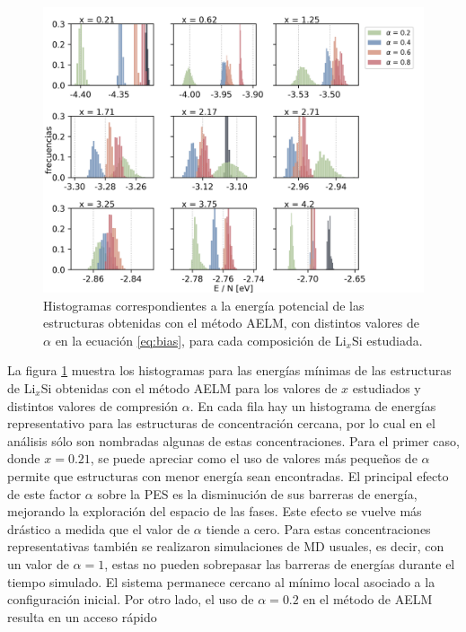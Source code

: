 \begin{figure}[th]
    \centering
    \includegraphics[width=\textwidth]{Silicio/caracterizacion/resultados/introduccion/energias.png}
    \caption{Histogramas correspondientes a la energía potencial de las 
    estructuras obtenidas con el método AELM, con distintos valores de $\alpha$
    en la ecuación \ref{eq:bias}, para cada composición de Li$_x$Si estudiada.}
    \label{fig:energias}
\end{figure}
La figura \ref{fig:energias} muestra los histogramas para las energías mínimas
de las estructuras de Li$_x$Si obtenidas con el método AELM para los valores de
$x$ estudiados y distintos valores de compresión $\alpha$. En cada fila hay un 
histograma de energías representativo para las estructuras de concentración 
cercana, por lo cual en el análisis sólo son nombradas algunas de estas 
concentraciones. Para el primer caso, donde $x = 0.21$, se puede apreciar como el 
uso de valores más pequeños de $\alpha$ permite que estructuras con menor energía 
sean encontradas. El principal efecto de este factor $\alpha$ sobre la PES es la 
disminución de sus barreras de energía, mejorando la exploración del espacio de 
las fases. Este efecto se vuelve más drástico a medida que el valor de $\alpha$ 
tiende a cero. Para estas concentraciones representativas también se realizaron 
simulaciones de MD usuales, es decir, con un valor de $\alpha = 1$, estas no 
pueden sobrepasar las barreras de energías durante el tiempo simulado. El sistema 
permanece cercano al mínimo local asociado a la configuración inicial. Por otro 
lado, el uso de $\alpha = 0.2$ en el método de AELM resulta en un acceso rápido
